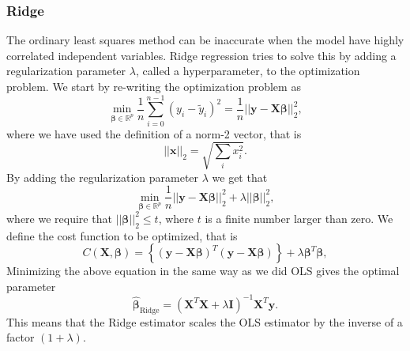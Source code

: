 \subsubsection{Ridge}
The ordinary least squares method can be inaccurate when the model have highly correlated independent variables. Ridge regression tries to solve this by adding a regularization parameter $\lambda$, called a hyperparameter, to the optimization problem. We start by re-writing the optimization problem as 
$$
{\displaystyle \min_{\boldsymbol{\beta}\in
{\mathbb{R}}^{p}}}\frac{1}{n}\sum_{i=0}^{n-1}\left(y_i-\tilde{y}_i\right)^2=\frac{1}{n}\vert\vert \boldsymbol{y}-\boldsymbol{X}\boldsymbol{\beta}\vert\vert_2^2,
$$
where we have used the definition of  a norm-2 vector, that is
$$
\vert\vert \boldsymbol{x}\vert\vert_2 = \sqrt{\sum_i x_i^2}.
$$
By adding the regularization parameter $\lambda$ we get that
$$
{\displaystyle \min_{\boldsymbol{\beta}\in
{\mathbb{R}}^{p}}}\frac{1}{n}\vert\vert \boldsymbol{y}-\boldsymbol{X}\boldsymbol{\beta}\vert\vert_2^2+\lambda\vert\vert \boldsymbol{\beta}\vert\vert_2^2,
$$
where we
require that $\vert\vert \boldsymbol{\beta}\vert\vert_2^2\le t$, where $t$ is
a finite number larger than zero. We define the cost function to be optimized, that is
$$
C(\boldsymbol{X},\boldsymbol{\beta})=\left\{(\boldsymbol{y}-\boldsymbol{X}\boldsymbol{\beta})^T(\boldsymbol{y}-\boldsymbol{X}\boldsymbol{\beta})\right\}+\lambda\boldsymbol{\beta}^T\boldsymbol{\beta},
$$
Minimizing the above equation in the same way as we did OLS gives the optimal parameter
\begin{equation}\label{eq:beta_ridge}
\hat{\boldsymbol{\beta}}_{\mathrm{Ridge}} = \left(\boldsymbol{X}^T\boldsymbol{X}+\lambda\boldsymbol{I}\right)^{-1}\boldsymbol{X}^T\boldsymbol{y}.
\end{equation}
This means that the Ridge estimator scales the OLS estimator by the inverse of a factor $(1+\lambda)$.


